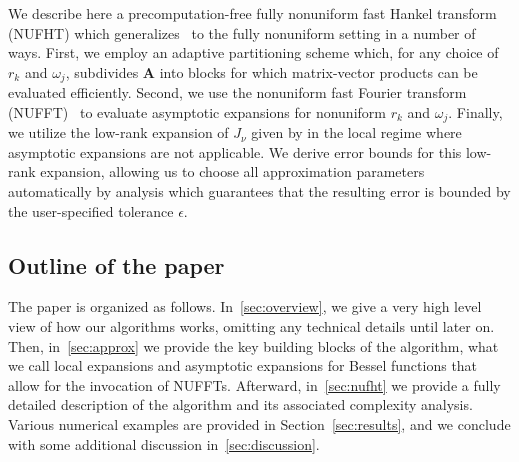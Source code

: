 We describe here a precomputation-free fully nonuniform fast Hankel transform
(NUFHT) which generalizes~\cite{townsend2015fast} to the fully nonuniform setting in a number of ways. First, we
employ an adaptive partitioning scheme which, for any choice of $r_k$ and
$\omega_j$, subdivides $\bm{A}$ into blocks for which matrix-vector products can
be evaluated efficiently. Second, we use the nonuniform fast Fourier transform
(NUFFT)~\cite{dutt1993fast, greengard2004accelerating} to evaluate asymptotic
expansions for nonuniform $r_k$ and $\omega_j$. Finally, we utilize the low-rank
expansion of $J_\nu$ given by \cite{wimp1962polynomial} in the local regime
where asymptotic expansions are not applicable. We derive error bounds for this
low-rank expansion, allowing us to choose all approximation parameters
automatically by analysis which guarantees that the resulting error is bounded
by the user-specified tolerance $\epsilon$.



\subsection*{Outline of the paper}

The paper is organized as follows. In~\ref{sec:overview}, we give a very high
level view of how our algorithms works, omitting any technical details until
later on. Then, in~\ref{sec:approx} we provide the key building blocks of the
algorithm, what we call local expansions and asymptotic expansions for Bessel
functions that allow for the invocation of NUFFTs. Afterward, in~\ref{sec:nufht}
we provide a fully detailed description of the algorithm and its associated
complexity analysis. Various numerical examples are provided in
Section~\ref{sec:results}, and we conclude with some additional discussion in~\ref{sec:discussion}.


